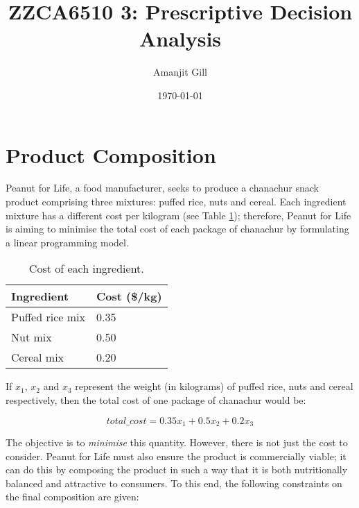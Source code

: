 \documentclass[11pt, a4paper]{article}
\title{\LARGE\bfseries ZZCA6510 3: Prescriptive Decision Analysis}
\author{\Large Amanjit Gill}
\date{\normalsize \today}
\begin{document}
    
    \maketitle

    \thispagestyle{empty}

    \newpage

    \addtocounter{page}{-1}

    \section{Product Composition}

    Peanut for Life, a food manufacturer, seeks to produce a chanachur snack product comprising three mixtures: puffed rice, nuts and cereal. Each ingredient mixture has a different cost per kilogram (see Table \ref{costs}); therefore, Peanut for Life is aiming to minimise the total cost of each package of chanachur by formulating a linear programming model. 
    
    \begin{table}[!ht]
        \centering
        \caption{Cost of each ingredient.}
        \begin{tabular}{|l|l|}
            \hline
            Ingredient & Cost (\$/kg) \\ \hline
            Puffed rice mix & 0.35 \\ \hline
            Nut mix & 0.50 \\ \hline
            Cereal mix & 0.20 \\ \hline          
        \end{tabular}
        \label{costs}
    \end{table}
    
    
    If $x_{1}$, $x_{2}$ and $x_{3}$ represent the weight (in kilograms) of puffed rice, nuts and cereal respectively, then the total cost of one package of chanachur would be:

    \begin{equation}
        total\_cost = 0.35x_1 + 0.5x_2 + 0.2x_3
        \label{obj_func1}
    \end{equation}
    
    The objective is to \textit{minimise} this quantity. However, there is not just the cost to consider. Peanut for Life must also ensure the product is commercially viable; it can do this by composing the product in such a way that it is both nutritionally balanced and attractive to consumers. To this end, the following constraints on the final composition are given:
\end{document}
